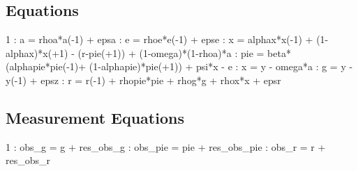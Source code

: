 \documentclass{article}%
\begin{document}
\subsection{Equations}%
\label{subsec:Equations}%
 1    :  a = rhoa*a({-}1) + epsa\newline%
    :  e = rhoe*e({-}1) + epse\newline%
    :  x = alphax*x({-}1) + (1{-}alphax)*x(+1) {-} (r{-}pie(+1)) + (1{-}omega)*(1{-}rhoa)*a\newline%
    :  pie = beta*(alphapie*pie({-}1)+ (1{-}alphapie)*pie(+1)) + psi*x {-} e\newline%
    :  x = y {-} omega*a\newline%
    :  g = y {-} y({-}1) + epsz\newline%
    :  r =  r({-}1) + rhopie*pie + rhog*g + rhox*x + epsr\newline%

%
\subsection{Measurement Equations}%
\label{subsec:MeasurementEquations}%
 1    :  obs\_g   = g   + res\_obs\_g\newline%
    :  obs\_pie = pie + res\_obs\_pie\newline%
    :  obs\_r   = r   + res\_obs\_r\newline%

%
\end{document}
